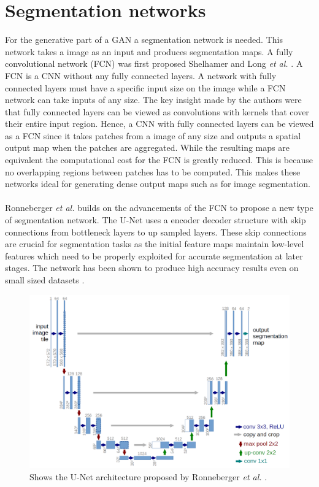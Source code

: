 \documentclass{kththesis}
\begin{document}
\section{Segmentation networks}
For the generative part of a GAN a segmentation network is needed. This network takes a image as an input and produces segmentation maps.
A fully convolutional network (FCN) was first proposed Shelhamer and Long \textit{et al.} \parencite{shelhamer_fully_2016}. A FCN is a CNN without any fully connected layers. A network with fully connected layers must have a specific input size on the image while a FCN network can take inputs of any size. The key insight made by the authors were that fully connected layers can be viewed as convolutions with kernels that cover their entire input region. Hence, a CNN with fully connected layers can be viewed as a FCN since it takes patches from a image of any size and outputs a spatial output map when the patches are aggregated. While the resulting maps are equivalent the computational cost for the FCN is greatly reduced. This is because no overlapping regions between patches has to be computed. This makes these networks ideal for generating dense output maps such as for image segmentation.\\
\\
Ronneberger \textit{et al.} \parencite{ronneberger_u-net:_2015} builds on the advancements of the FCN to propose a new type of segmentation network. The U-Net uses a encoder decoder structure with skip connections from bottleneck layers to up sampled layers. These skip connections are crucial for segmentation tasks as the initial feature maps maintain low-level features which need to be properly exploited for accurate segmentation at later stages. The network has been shown to produce high accuracy results even on small sized datasets \parencite{son_retinal_2017, ronneberger_u-net:_2015, isola_image--image_2016, xue_segan:_2017, yang_automatic_2017}. 
\begin{figure}[H]
  \centering
      \includegraphics[scale=0.2]{u-net}
  \caption{Shows the U-Net architecture proposed by Ronneberger \textit{et al.} \parencite{ronneberger_u-net:_2015}.}\label{fig:unet}
\end{figure}
\end{document}
